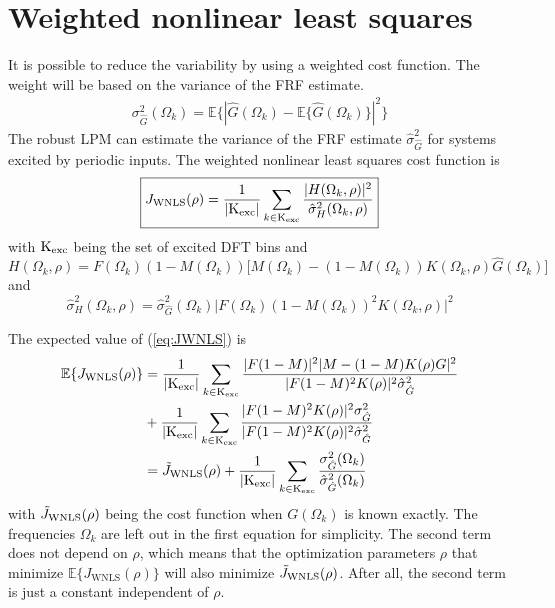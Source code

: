\section{Weighted nonlinear least squares}
\label{sec:WNLS}
It is possible to reduce the variability by using a weighted cost function. The weight will be based on the variance of the FRF estimate.
\begin{align*}
    \sigma^2_{\hat G}(\Omega_k) = \mathbb{E}\big\{|\hat G(\Omega_k)- \mathbb{E}\{\hat G(\Omega_k)\}|^2\big\} 
\end{align*}
The robust LPM can estimate the variance of the FRF estimate $\hat\sigma^2_{\hat G}$ for systems excited by periodic inputs. The weighted nonlinear least squares cost function is
\begin{equation}
\boxed{
    J_\mathrm{WNLS}(\rho) = \frac{1}{|\text{K}_{\text{exc}}|}\sum_{k \in \text{K}_{\text{exc}}} \frac{|H(\Omega_k,\rho)|^2}{\hat\sigma^2_{H}(\Omega_k,\rho)}}
    \label{eq:JWNLS}
\end{equation}
with $\text{K}_{\text{exc}}$ being the set of excited DFT bins and
\begin{equation*}
    H(\Omega_k,\rho) = F(\Omega_k)(1-M(\Omega_k)) \Big[M(\Omega_k)-(1-M(\Omega_k))K(\Omega_k,\rho) \hat{G}(\Omega_k)\Big]
\end{equation*}
and
\begin{equation*}
\hat\sigma^2_{H}(\Omega_k,\rho) = \hat\sigma^2_{\hat G}(\Omega_k) \Big| F(\Omega_k) (1-M(\Omega_k))^2K(\Omega_k,\rho) \Big|^2
\end{equation*}


The expected value of (\ref{eq:JWNLS}) is
\begin{align*}
\mathbb{E}\{J_\mathrm{WNLS}(\rho)\} &=
 \frac{1}{|\text{K}_{\text{exc}}|} \sum_{k \in \text{K}_{\text{exc}}} \frac{|F(1-M)|^2 |M-(1-M)K(\rho)G|^2}{|F(1-M)^2 K(\rho)|^2 \hat\sigma^2_{\hat G}}\\ 
 &+ \frac{1}{|\text{K}_{\text{exc}}|} \sum_{k \in \text{K}_{\text{exc}}} \frac{|F(1-M)^2 K(\rho)|^2 \sigma^2_{\hat G}}{|F(1-M)^2 K(\rho)|^2 \hat\sigma^2_{\hat G}} \\
&=  \Tilde{J}_\mathrm{WNLS}(\rho) + \frac{1}{|\text{K}_{\text{exc}}|} \sum_{k \in \text{K}_{\text{exc}}} \frac{\sigma^2_{\hat G}(\Omega_k)}{\hat\sigma^2_{\hat G}(\Omega_k)} 
\end{align*}
with $\Tilde{J}_\mathrm{WNLS}(\rho)$ being the cost function when $G(\Omega_k)$ is known exactly. The frequencies $\Omega_k$ are left out in the first equation for simplicity. The second term does not depend on $\rho$, which means that the optimization parameters $\rho$ that minimize $\mathbb{E}\{J_\mathrm{WNLS}(\rho)\}$ will also minimize $\Tilde{J}_\mathrm{WNLS}(\rho)$. After all, the second term is just a constant independent of $\rho$.


